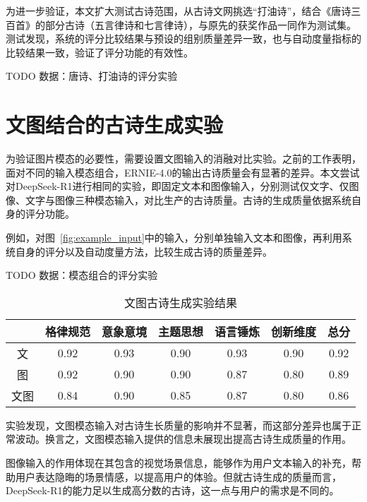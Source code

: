 为进一步验证，本文扩大测试古诗范围，从古诗文网挑选“打油诗”，结合《唐诗三百首》的部分古诗（五言律诗和七言律诗），与原先的获奖作品一同作为测试集。测试发现，系统的评分比较结果与预设的组别质量差异一致，也与自动度量指标的比较结果一致，验证了评分功能的有效性。

TODO 数据：唐诗、打油诗的评分实验

\section{文图结合的古诗生成实验}

为验证图片模态的必要性，需要设置文图输入的消融对比实验。之前的工作表明，面对不同的输入模态组合，ERNIE-4.0的输出古诗质量会有显著的差异。本文尝试对DeepSeek-R1进行相同的实验，即固定文本和图像输入，分别测试仅文字、仅图像、文字与图像三种模态输入，对比生产的古诗质量。古诗的生成质量依据系统自身的评分功能。

例如，对图~\ref{fig:example_input}中的输入，分别单独输入文本和图像，再利用系统自身的评分以及自动度量方法，比较生成古诗的质量差异。

TODO 数据：模态组合的评分实验
\begin{table}[ht]
  \centering
  \caption{文图古诗生成实验结果}
  \label{tab:test_generation_modal}
  \begin{tabular}{ccccccc}
      \toprule
      & 格律规范&	意象意境&	主题思想&	语言锤炼&	创新维度&	总分\\
      \midrule
      文& 0.92& 0.93& 0.90& 0.93& 0.90& 0.92 \\
      图& 0.92& 0.90& 0.90& 0.87& 0.80& 0.89 \\
      文图& 0.84& 0.90& 0.85& 0.87& 0.80& 0.86\\
      \bottomrule
  \end{tabular}
\end{table}

实验发现，文图模态输入对古诗生长质量的影响并不显著，而这部分差异也属于正常波动。换言之，文图模态输入提供的信息未展现出提高古诗生成质量的作用。

图像输入的作用体现在其包含的视觉场景信息，能够作为用户文本输入的补充，帮助用户表达隐晦的场景情感，以提高用户的体验。但就古诗生成的质量而言，DeepSeek-R1的能力足以生成高分数的古诗，这一点与用户的需求是不同的。